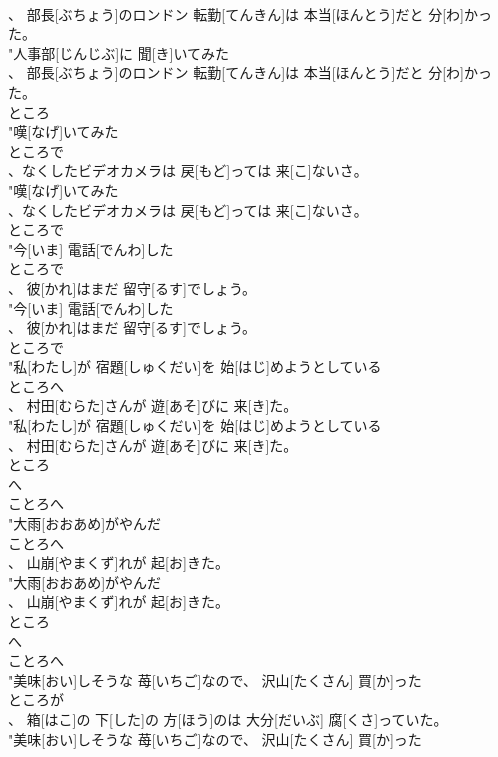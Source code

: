 \documentclass[8pt]{extreport}
\begin{document}
\begin{CJK}{UTF8}{min}
\\	、 部長[ぶちょう]のロンドン 転勤[てんきん]は 本当[ほんとう]だと 分[わ]かった。
\\	"人事部[じんじぶ]に 聞[き]いてみた
\\	、 部長[ぶちょう]のロンドン 転勤[てんきん]は 本当[ほんとう]だと 分[わ]かった。
\\	ところ
\\	"嘆[なげ]いてみた
\\	ところで
\\	、なくしたビデオカメラは 戻[もど]っては 来[こ]ないさ。
\\	"嘆[なげ]いてみた
\\	、なくしたビデオカメラは 戻[もど]っては 来[こ]ないさ。
\\	ところで
\\	"今[いま] 電話[でんわ]した
\\	ところで
\\	、 彼[かれ]はまだ 留守[るす]でしょう。
\\	"今[いま] 電話[でんわ]した
\\	、 彼[かれ]はまだ 留守[るす]でしょう。
\\	ところで
\\	"私[わたし]が 宿題[しゅくだい]を 始[はじ]めようとしている
\\	ところへ
\\	、 村田[むらた]さんが 遊[あそ]びに 来[き]た。
\\	"私[わたし]が 宿題[しゅくだい]を 始[はじ]めようとしている
\\	、 村田[むらた]さんが 遊[あそ]びに 来[き]た。
\\	ところ 
\\	へ 
\\	ことろへ
\\	"大雨[おおあめ]がやんだ
\\	ことろへ
\\	、 山崩[やまくず]れが 起[お]きた。
\\	"大雨[おおあめ]がやんだ
\\	、 山崩[やまくず]れが 起[お]きた。
\\	ところ 
\\	へ 
\\	ことろへ
\\	"美味[おい]しそうな 苺[いちご]なので、 沢山[たくさん] 買[か]った
\\	ところが
\\	、 箱[はこ]の 下[した]の 方[ほう]のは 大分[だいぶ] 腐[くさ]っていた。
\\	"美味[おい]しそうな 苺[いちご]なので、 沢山[たくさん] 買[か]った

\end{CJK}
\end{document}
